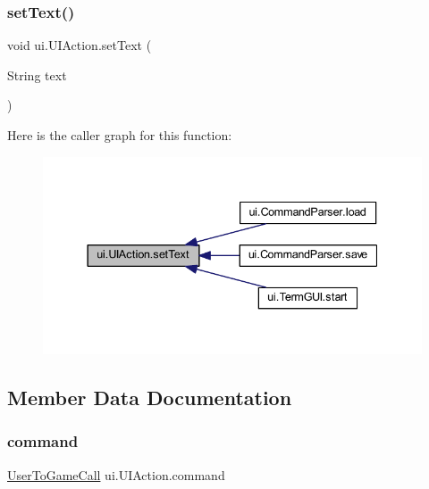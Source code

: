 \subsubsection{\texorpdfstring{set\+Text()}{setText()}}
{\footnotesize\ttfamily void ui.\+U\+I\+Action.\+set\+Text (\begin{DoxyParamCaption}\item[{String}]{text }\end{DoxyParamCaption})\hspace{0.3cm}{\ttfamily [inline]}}

Here is the caller graph for this function\+:
\nopagebreak
\begin{figure}[H]
\begin{center}
\leavevmode
\includegraphics[width=337pt]{classui_1_1_u_i_action_aa2b9a2f369994d628cb701d5dbc50698_icgraph}
\end{center}
\end{figure}


\subsection{Member Data Documentation}
\mbox{\label{classui_1_1_u_i_action_ae59252bc304d98120bf7eecd3cedcaca}} 
\subsubsection{\texorpdfstring{command}{command}}
{\footnotesize\ttfamily \mbox{\hyperlink{enumui_1_1commands_1_1_user_to_game_call}{User\+To\+Game\+Call}} ui.\+U\+I\+Action.\+command\hspace{0.3cm}{\ttfamily [private]}}

\mbox{\label{classui_1_1_u_i_action_a92b8841c1eaa4157ab4e476b698b6378}} 
